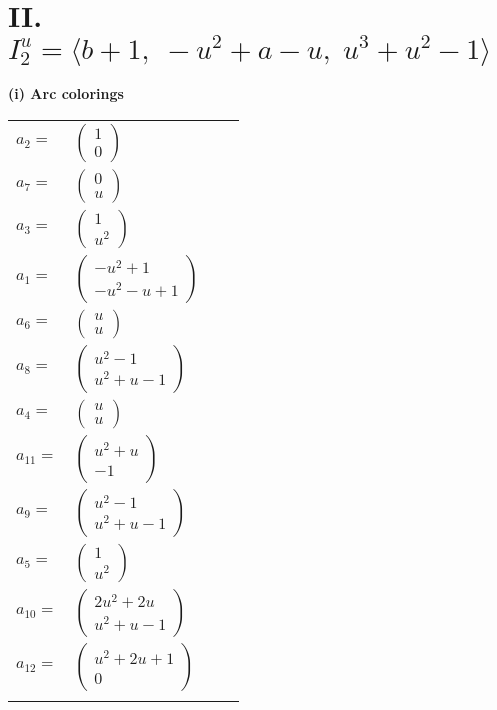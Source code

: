 \documentclass[1p]{elsarticle_modified}
\theoremstyle{definition}
\begin{document}
\centering \section*{II. $I^u_{2}= \langle b+1,\;- u^2+a- u,\;u^3+u^2-1 \rangle$}
\flushleft \textbf{(i) Arc colorings}\\
\begin{tabular}{m{7pt} m{180pt} m{7pt} m{180pt} }
\flushright $a_{2}=$&$\begin{pmatrix}1\\0\end{pmatrix}$ \\
\flushright $a_{7}=$&$\begin{pmatrix}0\\u\end{pmatrix}$ \\
\flushright $a_{3}=$&$\begin{pmatrix}1\\u^2\end{pmatrix}$ \\
\flushright $a_{1}=$&$\begin{pmatrix}- u^2+1\\- u^2- u+1\end{pmatrix}$ \\
\flushright $a_{6}=$&$\begin{pmatrix}u\\u\end{pmatrix}$ \\
\flushright $a_{8}=$&$\begin{pmatrix}u^2-1\\u^2+u-1\end{pmatrix}$ \\
\flushright $a_{4}=$&$\begin{pmatrix}u\\u\end{pmatrix}$ \\
\flushright $a_{11}=$&$\begin{pmatrix}u^2+u\\-1\end{pmatrix}$ \\
\flushright $a_{9}=$&$\begin{pmatrix}u^2-1\\u^2+u-1\end{pmatrix}$ \\
\flushright $a_{5}=$&$\begin{pmatrix}1\\u^2\end{pmatrix}$ \\
\flushright $a_{10}=$&$\begin{pmatrix}2 u^2+2 u\\u^2+u-1\end{pmatrix}$ \\
\flushright $a_{12}=$&$\begin{pmatrix}u^2+2 u+1\\0\end{pmatrix}$\\&\end{tabular}
\end{document}
